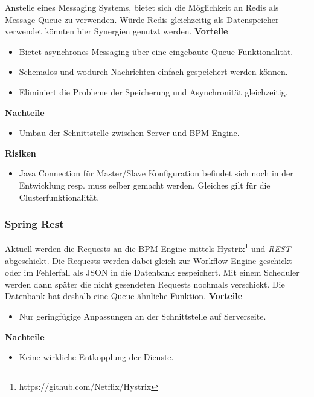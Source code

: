 Anstelle eines Messaging Systems, bietet sich die Möglichkeit an Redis als Message Queue zu verwenden. Würde Redis gleichzeitig als Datenspeicher verwendet könnten hier Synergien genutzt werden. 
\newline
\newline
\textbf{Vorteile}
\begin{itemize}
	\item Bietet asynchrones Messaging über eine eingebaute Queue Funktionalität.
	\item Schemalos und wodurch Nachrichten einfach gespeichert werden können.
	\item Eliminiert die Probleme der Speicherung und Asynchronität gleichzeitig.
\end{itemize}
\textbf{Nachteile}
\begin{itemize}
	\item Umbau der Schnittstelle zwischen Server und BPM Engine.
\end{itemize}
\textbf{Risiken}
\begin{itemize}
	\item Java Connection für Master/Slave Konfiguration befindet sich noch in der Entwicklung resp. muss selber gemacht werden. Gleiches gilt für die Clusterfunktionalität.
\end{itemize}

\subsubsection{Spring Rest}

Aktuell werden die Requests an die BPM Engine mittels Hystrix\footnote{https://github.com/Netflix/Hystrix} und \textit{\gls{REST}} abgeschickt. Die Requests werden dabei gleich zur Workflow Engine geschickt oder im Fehlerfall als JSON in die Datenbank gespeichert. Mit einem Scheduler werden dann später die nicht gesendeten Requests nochmals verschickt. Die Datenbank hat deshalb eine Queue ähnliche Funktion.
\newline
\newline
\textbf{Vorteile}
\begin{itemize}
	\item Nur geringfügige Anpassungen an der Schnittstelle auf Serverseite.
\end{itemize}
\textbf{Nachteile}
\begin{itemize}
	\item Keine wirkliche Entkopplung der Dienste.
\end{itemize}

